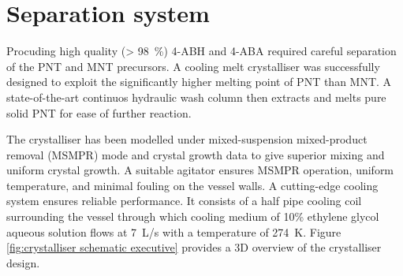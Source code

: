 \section*{Separation system}

Procuding high quality (\SI{> 98}{\percent}) 4-ABH and 4-ABA required careful separation of the PNT and MNT precursors. A cooling melt crystalliser was successfully designed to exploit the significantly higher melting point of PNT than MNT. A state-of-the-art continuos hydraulic wash column then extracts and melts pure solid PNT for ease of further reaction. 


The crystalliser has been modelled under mixed-suspension mixed-product removal (MSMPR) mode and crystal growth data to give superior mixing and uniform crystal growth. A suitable agitator ensures MSMPR operation, uniform temperature, and minimal fouling on the vessel walls. A cutting-edge cooling system ensures reliable performance. It consists of a half pipe cooling coil surrounding the vessel through which cooling medium of 10\% ethylene glycol aqueous solution flows at \SI{7}{L/s} with a temperature of \SI{274}{K}. Figure \ref{fig:crystalliser schematic executive} provides a 3D overview of the crystalliser design.


